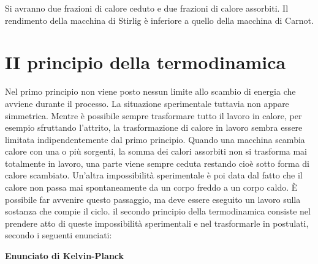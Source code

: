 \documentclass[10pt,a4paper]{book}
\begin{document}
Si avranno due frazioni di calore ceduto e due frazioni di calore assorbiti. Il rendimento della macchina di Stirlig è inferiore a quello della macchina di Carnot.







































\section{II principio della termodinamica}

Nel primo principio non viene posto nessun limite allo scambio di energia che avviene durante il processo. La situazione sperimentale tuttavia non appare simmetrica. Mentre è possibile sempre trasformare tutto il lavoro in calore, per esempio sfruttando l'attrito, la trasformazione di calore in lavoro sembra essere limitata indipendentemente dal primo principio. Quando una macchina scambia calore con una o più sorgenti, la somma dei calori assorbiti non si trasforma mai totalmente in lavoro, una parte viene sempre ceduta restando cioè sotto forma di calore scambiato. Un'altra impossibilità sperimentale è poi data dal fatto che il calore non passa mai spontaneamente da un corpo freddo a un corpo caldo. È possibile far avvenire questo passaggio, ma deve essere eseguito un lavoro sulla sostanza che compie il ciclo.
il secondo principio della termodinamica consiste nel prendere atto di queste impossibilità sperimentali e nel trasformarle in postulati, secondo i seguenti enunciati:

\textbf{Enunciato di Kelvin-Planck}
\end{document}
